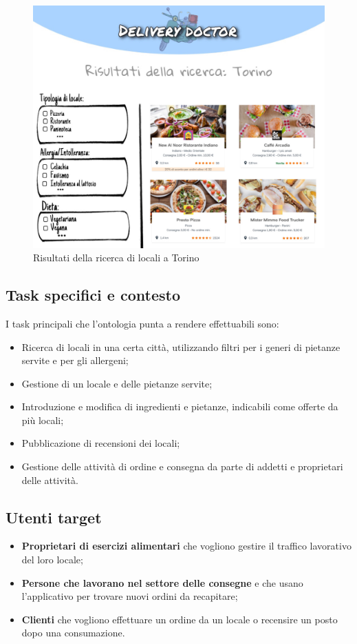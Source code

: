 \documentclass[12pt]{article}
\begin{document}
\begin{figure}[H]
    \centering
         \includegraphics[width=12cm]{files/mockup2.jpeg}
    \caption{Risultati della ricerca di locali a Torino}
\end{figure}

\subsection{Task specifici e contesto}
I task principali che l'ontologia punta a rendere effettuabili sono:
\begin{itemize}
    \item Ricerca di locali in una certa città, utilizzando filtri per i generi di pietanze servite e per gli allergeni;
    \item Gestione di un locale e delle pietanze servite;
    \item Introduzione e modifica di ingredienti e pietanze, indicabili come offerte da più locali;
    \item Pubblicazione di recensioni dei locali;
    \item Gestione delle attività di ordine e consegna da parte di addetti e proprietari delle attività.
\end{itemize}

\subsection{Utenti target}
\begin{itemize}
    \item \textbf{Proprietari di esercizi alimentari} che vogliono gestire il traffico lavorativo del loro locale;
    \item \textbf{Persone che lavorano nel settore delle consegne} e che usano l'applicativo per trovare nuovi ordini da recapitare;
    \item \textbf{Clienti} che vogliono effettuare un ordine da un locale o recensire un posto dopo una consumazione.
\end{itemize}
\end{document}
